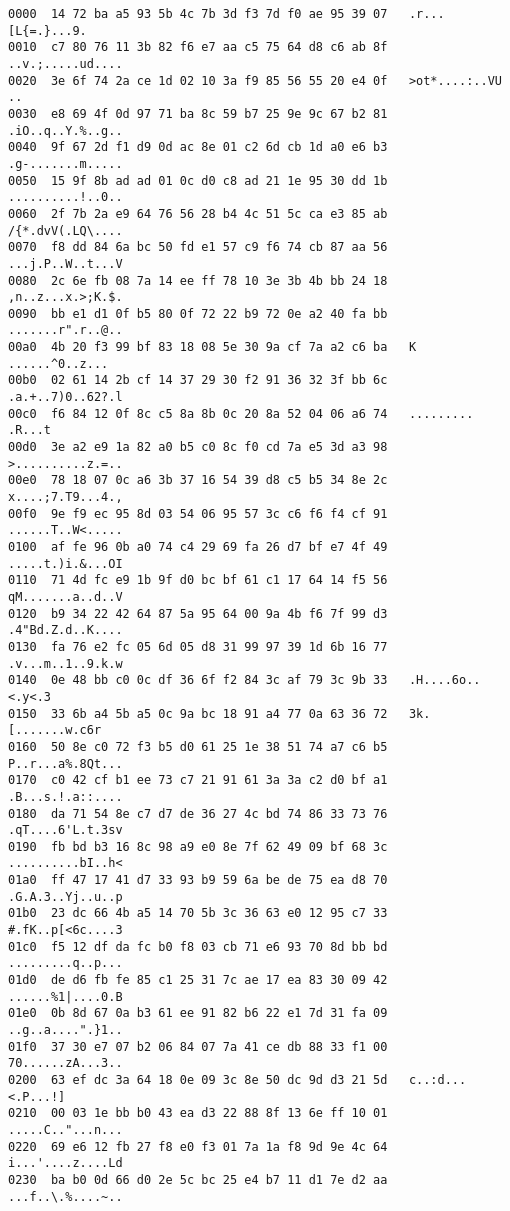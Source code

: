 \begin{lstlisting}
0000  14 72 ba a5 93 5b 4c 7b 3d f3 7d f0 ae 95 39 07   .r...[L{=.}...9.
0010  c7 80 76 11 3b 82 f6 e7 aa c5 75 64 d8 c6 ab 8f   ..v.;.....ud....
0020  3e 6f 74 2a ce 1d 02 10 3a f9 85 56 55 20 e4 0f   >ot*....:..VU ..
0030  e8 69 4f 0d 97 71 ba 8c 59 b7 25 9e 9c 67 b2 81   .iO..q..Y.%..g..
0040  9f 67 2d f1 d9 0d ac 8e 01 c2 6d cb 1d a0 e6 b3   .g-.......m.....
0050  15 9f 8b ad ad 01 0c d0 c8 ad 21 1e 95 30 dd 1b   ..........!..0..
0060  2f 7b 2a e9 64 76 56 28 b4 4c 51 5c ca e3 85 ab   /{*.dvV(.LQ\....
0070  f8 dd 84 6a bc 50 fd e1 57 c9 f6 74 cb 87 aa 56   ...j.P..W..t...V
0080  2c 6e fb 08 7a 14 ee ff 78 10 3e 3b 4b bb 24 18   ,n..z...x.>;K.$.
0090  bb e1 d1 0f b5 80 0f 72 22 b9 72 0e a2 40 fa bb   .......r".r..@..
00a0  4b 20 f3 99 bf 83 18 08 5e 30 9a cf 7a a2 c6 ba   K ......^0..z...
00b0  02 61 14 2b cf 14 37 29 30 f2 91 36 32 3f bb 6c   .a.+..7)0..62?.l
00c0  f6 84 12 0f 8c c5 8a 8b 0c 20 8a 52 04 06 a6 74   ......... .R...t
00d0  3e a2 e9 1a 82 a0 b5 c0 8c f0 cd 7a e5 3d a3 98   >..........z.=..
00e0  78 18 07 0c a6 3b 37 16 54 39 d8 c5 b5 34 8e 2c   x....;7.T9...4.,
00f0  9e f9 ec 95 8d 03 54 06 95 57 3c c6 f6 f4 cf 91   ......T..W<.....
0100  af fe 96 0b a0 74 c4 29 69 fa 26 d7 bf e7 4f 49   .....t.)i.&...OI
0110  71 4d fc e9 1b 9f d0 bc bf 61 c1 17 64 14 f5 56   qM.......a..d..V
0120  b9 34 22 42 64 87 5a 95 64 00 9a 4b f6 7f 99 d3   .4"Bd.Z.d..K....
0130  fa 76 e2 fc 05 6d 05 d8 31 99 97 39 1d 6b 16 77   .v...m..1..9.k.w
0140  0e 48 bb c0 0c df 36 6f f2 84 3c af 79 3c 9b 33   .H....6o..<.y<.3
0150  33 6b a4 5b a5 0c 9a bc 18 91 a4 77 0a 63 36 72   3k.[.......w.c6r
0160  50 8e c0 72 f3 b5 d0 61 25 1e 38 51 74 a7 c6 b5   P..r...a%.8Qt...
0170  c0 42 cf b1 ee 73 c7 21 91 61 3a 3a c2 d0 bf a1   .B...s.!.a::....
0180  da 71 54 8e c7 d7 de 36 27 4c bd 74 86 33 73 76   .qT....6'L.t.3sv
0190  fb bd b3 16 8c 98 a9 e0 8e 7f 62 49 09 bf 68 3c   ..........bI..h<
01a0  ff 47 17 41 d7 33 93 b9 59 6a be de 75 ea d8 70   .G.A.3..Yj..u..p
01b0  23 dc 66 4b a5 14 70 5b 3c 36 63 e0 12 95 c7 33   #.fK..p[<6c....3
01c0  f5 12 df da fc b0 f8 03 cb 71 e6 93 70 8d bb bd   .........q..p...
01d0  de d6 fb fe 85 c1 25 31 7c ae 17 ea 83 30 09 42   ......%1|....0.B
01e0  0b 8d 67 0a b3 61 ee 91 82 b6 22 e1 7d 31 fa 09   ..g..a....".}1..
01f0  37 30 e7 07 b2 06 84 07 7a 41 ce db 88 33 f1 00   70......zA...3..
0200  63 ef dc 3a 64 18 0e 09 3c 8e 50 dc 9d d3 21 5d   c..:d...<.P...!]
0210  00 03 1e bb b0 43 ea d3 22 88 8f 13 6e ff 10 01   .....C.."...n...
0220  69 e6 12 fb 27 f8 e0 f3 01 7a 1a f8 9d 9e 4c 64   i...'....z....Ld
0230  ba b0 0d 66 d0 2e 5c bc 25 e4 b7 11 d1 7e d2 aa   ...f..\.%....~..

\end{lstlisting}
